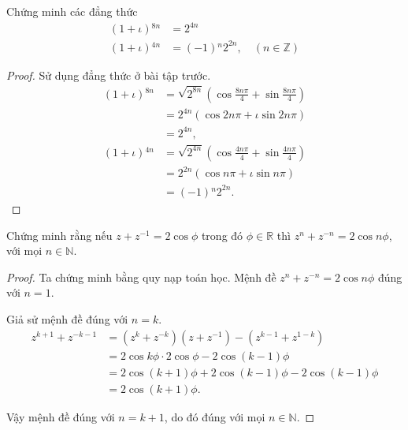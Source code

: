 \begin{exercise}Chứng minh các đẳng thức
    \begin{align*}
        (1+\iota){}^{8n} & = 2^{4n}                                 \\
        (1+\iota){}^{4n} & = (-1){}^{n}2^{2n},\quad(n\in\mathbb{Z})
    \end{align*}
\end{exercise}

\begin{proof}
    Sử dụng đẳng thức ở bài tập trước.
    \begin{align*}
        (1+\iota){}^{8n} & = \sqrt{2^{8n}}\left(\cos\frac{8n\pi}{4} + \sin\frac{8n\pi}{4}\right) \\
                         & = 2^{4n}\left(\cos 2n\pi + \iota\sin 2n\pi\right)                     \\
                         & = 2^{4n}, \\
        (1+\iota){}^{4n} & = \sqrt{2^{4n}}\left(\cos\frac{4n\pi}{4} + \sin\frac{4n\pi}{4}\right) \\
                         & = 2^{2n}\left(\cos n\pi + \iota\sin n\pi\right)                       \\
                         & = (-1){}^{n}2^{2n}.
    \end{align*}
\end{proof}

\begin{exercise}
    Chứng minh rằng nếu $z + z^{-1} = 2\cos\phi$ trong đó $\phi\in\mathbb{R}$ thì $z^{n} + z^{-n} = 2\cos n\phi$, với mọi $n\in\mathbb{N}$.
\end{exercise}

\begin{proof}
    Ta chứng minh bằng quy nạp toán học. Mệnh đề $z^{n} + z^{-n} = 2\cos n\phi$ đúng với $n = 1$.
    
    Giả sử mệnh đề đúng với $n = k$.
    \begin{align*}
        z^{k+1} + z^{-k-1} & = (z^{k} + z^{-k})(z + z^{-1}) - (z^{k-1} + z^{1-k}) \\
                           & = 2\cos k\phi \cdot 2\cos\phi - 2\cos (k-1)\phi      \\
                           & = 2\cos(k+1)\phi + 2\cos(k-1)\phi - 2\cos(k-1)\phi   \\
                           & = 2\cos(k+1)\phi.
    \end{align*}
    
    Vậy mệnh đề đúng với $n = k + 1$, do đó đúng với mọi $n\in\mathbb{N}$.
\end{proof}

